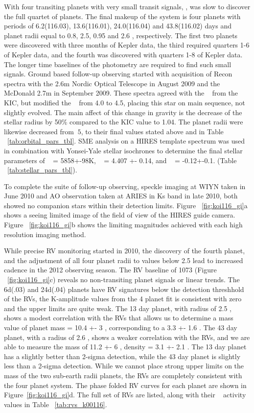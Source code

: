 \documentclass{emulateapj}
\begin{document}
With four transiting planets with very small transit signals, {\koioneonesix}, \ek was slow to discover the full quartet of planets. The final makeup of the system is four planets with periods of 6.2(116.03), 13.6(116.01), 24.0(116.04) and 43.8(116.02) days and planet radii equal to 0.8, 2.5, 0.95 and 2.6 \rearthe, respectively. The first two planets were discovered with three months of Kepler data, the third required quarters 1-6 of Kepler data, and the fourth was discovered with quarters 1-8 of Kepler data. The longer time baselines of the \ek photometry are required to find such small signals.  Ground based follow-up observing started with acquisition of Recon spectra with the 2.6m Nordic Optical Telescope in August 2009 and the  McDonald 2.7m in September 2009. These spectra agreed with the \teff~ from the KIC, but modified the \logg~ from 4.0 to 4.5, placing this star on main sequence, not slightly evolved. The main affect of this change in gravity is the decrease of the stellar radius by 50\% compared to the KIC value to 1.04\rsun. The planet radii were likewise decreased from $~5$\rearth, to their final values stated above and in Table ~\ref{tab:orbital_pars_tbl}.   SME analysis on a HIRES template spectrum  was used in combination with Yonsei-Yale stellar isochrones to determine the final stellar parameters of \teff~ = 5858+-98K, \logg~ = 4.407  +- 0.14, and \feh~ = -0.12+-0.1. (Table ~\ref{tab:stellar_pars_tbl}).

To complete the suite of follow-up observing, speckle imaging at WIYN taken in June 2010 and AO observation taken at ARIES in Ks band in late 2010, both showed no companion stars within their detection limits. Figure ~\ref{fig:koi116_gi}a shows a seeing limited  image of the field of view of the HIRES guide camera.  Figure ~\ref{fig:koi116_gi}b shows the limiting magnitudes achieved with each high resolution imaging method.  

While precise RV monitoring started in 2010, the discovery of the fourth planet, and the adjustment of all four planet radii to values below 2.5 \rearth lead to increased cadence in the 2012 observing season. The RV baseline of 1073 (Figure ~\ref{fig:koi116_gi}c) reveals no non-transiting planet signals or linear trends.
The 6d(.03) and 24d(.04) planets have RV signatures below the detection threshhold of the RVs, the K-amplitude values from the 4 planet fit is consistent with zero and the upper limits are quite weak. The 13 day planet, with radius of 2.5 \rearthe, shows a modest correlation with the RVs that allows us to determine a mass value  of planet mass = 10.4 +- 3 \mearthe, corresponding to a 3.3 +- 1.6 \gcc. The 43 day planet, with a radius of 2.6 \rearthe, shows a weaker correlation with the RVs, and we are able to measure the mass of 11.2 +- 6 \mearthe, density = 3.1 +- 2.1 \gcc.  The 13 day planet has a slightly better than  2-sigma detection, while the 43 day planet is slightly less than a 2-sigma detection. While we cannot place strong upper limits on the mass of the two sub-earth radii planets, the RVs are completely consistent with the four planet system. The phase folded RV curves for each planet are shown in Figure~\ref{fig:koi116_gi}d.
The full set of RVs are listed, along with their \rphk~ activity values in Table ~\ref{tab:rvs_k00116}.
\end{document}
